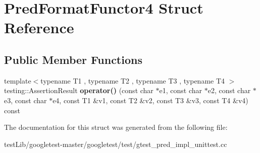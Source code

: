 \hypertarget{structPredFormatFunctor4}{}\section{Pred\+Format\+Functor4 Struct Reference}
\label{structPredFormatFunctor4}
\subsection*{Public Member Functions}
\begin{DoxyCompactItemize}
\item 
\mbox{\label{structPredFormatFunctor4_a97061d2b9eadf357f4e50a75f5a9af5b}} 
{\footnotesize template$<$typename T1 , typename T2 , typename T3 , typename T4 $>$ }\\testing\+::\+Assertion\+Result {\bfseries operator()} (const char $\ast$e1, const char $\ast$e2, const char $\ast$e3, const char $\ast$e4, const T1 \&v1, const T2 \&v2, const T3 \&v3, const T4 \&v4) const
\end{DoxyCompactItemize}


The documentation for this struct was generated from the following file\+:\begin{DoxyCompactItemize}
\item 
test\+Lib/googletest-\/master/googletest/test/gtest\+\_\+pred\+\_\+impl\+\_\+unittest.\+cc\end{DoxyCompactItemize}
